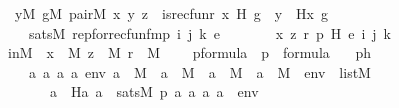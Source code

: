 \begin{isabellebody}
\isanewline
\ \ {\isacharparenleft}{\kern0pt}{\isasymexists}y{\isacharbrackleft}{\kern0pt}{\isacharhash}{\kern0pt}{\isacharhash}{\kern0pt}M{\isacharbrackright}{\kern0pt}{\isachardot}{\kern0pt}\ {\isasymexists}g{\isacharbrackleft}{\kern0pt}{\isacharhash}{\kern0pt}{\isacharhash}{\kern0pt}M{\isacharbrackright}{\kern0pt}{\isachardot}{\kern0pt}\ pair{\isacharparenleft}{\kern0pt}{\isacharhash}{\kern0pt}{\isacharhash}{\kern0pt}M{\isacharcomma}{\kern0pt}\ x{\isacharcomma}{\kern0pt}\ y{\isacharcomma}{\kern0pt}\ z{\isacharparenright}{\kern0pt}\ {\isasymand}\ is{\isacharunderscore}{\kern0pt}recfun{\isacharparenleft}{\kern0pt}r{\isacharcomma}{\kern0pt}\ x{\isacharcomma}{\kern0pt}\ H{\isacharcomma}{\kern0pt}\ g{\isacharparenright}{\kern0pt}\ {\isasymand}\ y\ {\isacharequal}{\kern0pt}\ H{\isacharparenleft}{\kern0pt}x{\isacharcomma}{\kern0pt}\ g{\isacharparenright}{\kern0pt}{\isacharparenright}{\kern0pt}\isanewline
\ \ \ {\isasymlongleftrightarrow}\ sats{\isacharparenleft}{\kern0pt}M{\isacharcomma}{\kern0pt}\ rep{\isacharunderscore}{\kern0pt}for{\isacharunderscore}{\kern0pt}recfun{\isacharunderscore}{\kern0pt}fm{\isacharparenleft}{\kern0pt}p{\isacharcomma}{\kern0pt}\ i{\isacharcomma}{\kern0pt}\ j{\isacharcomma}{\kern0pt}\ k{\isacharparenright}{\kern0pt}{\isacharcomma}{\kern0pt}\ e{\isacharparenright}{\kern0pt}{\isachardoublequoteclose}\ \isanewline
%
\isadelimproof
%
\endisadelimproof
%
\isatagproof
{}\isamarkupfalse%
\ {\isacharminus}{\kern0pt}\ \isanewline
\ \ \isamarkupfalse%
\ x\ z\ r\ p\ H\ e\ i\ j\ k\isanewline
\ \ \isamarkupfalse%
\ inM\ {\isacharcolon}{\kern0pt}\ {\isachardoublequoteopen}x\ {\isasymin}\ M{\isachardoublequoteclose}\ {\isachardoublequoteopen}z\ {\isasymin}\ M{\isachardoublequoteclose}\ {\isachardoublequoteopen}r\ {\isasymin}\ M{\isachardoublequoteclose}\ \isanewline
\ \ \ pformula\ {\isacharcolon}{\kern0pt}\ {\isachardoublequoteopen}p\ {\isasymin}\ formula{\isachardoublequoteclose}\isanewline
\ \ \ ph\ {\isacharcolon}{\kern0pt}\ \isanewline
\ \ \ \ {\isachardoublequoteopen}{\isacharparenleft}{\kern0pt}{\isasymAnd}a{}\ a{}\ a{}\ a{}\ env{\isachardot}{\kern0pt}\ a{}\ {\isasymin}\ M\ {\isasymLongrightarrow}\ a{}\ {\isasymin}\ M\ {\isasymLongrightarrow}\ a{}\ {\isasymin}\ M\ {\isasymLongrightarrow}\ a{}\ {\isasymin}\ M\ {\isasymLongrightarrow}\ env\ {\isasymin}\ list{\isacharparenleft}{\kern0pt}M{\isacharparenright}{\kern0pt}\ \isanewline
\ \ \ \ \ \ {\isasymLongrightarrow}\ a{}\ {\isacharequal}{\kern0pt}\ H{\isacharparenleft}{\kern0pt}a{}{\isacharcomma}{\kern0pt}\ a{}{\isacharparenright}{\kern0pt}\ {\isasymlongleftrightarrow}\ sats{\isacharparenleft}{\kern0pt}M{\isacharcomma}{\kern0pt}\ p{\isacharcomma}{\kern0pt}\ {\isacharbrackleft}{\kern0pt}a{}{\isacharcomma}{\kern0pt}\ a{}{\isacharcomma}{\kern0pt}\ a{}{\isacharcomma}{\kern0pt}\ a{}{\isacharbrackright}{\kern0pt}\ {\isacharat}{\kern0pt}\ env{\isacharparenright}{\kern0pt}{\isacharparenright}{\kern0pt}{\isachardoublequoteclose}\isanewline

\end{isabellebody}
